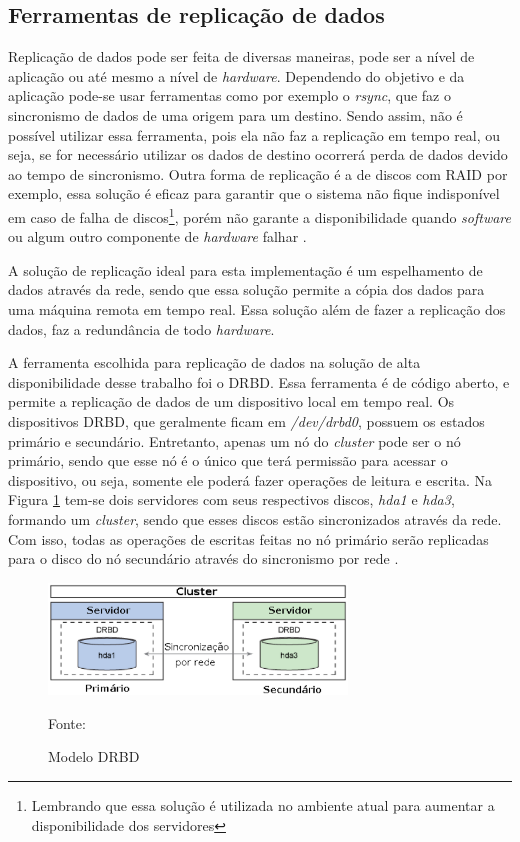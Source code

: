 \subsection{Ferramentas de replicação de dados}
\label{section:toolrepl}

Replicação de dados pode ser feita de diversas maneiras, pode ser a nível de aplicação ou até mesmo a nível de \textit{hardware}.
Dependendo do objetivo e da aplicação pode-se usar ferramentas como por exemplo o \textit{rsync}, que faz o sincronismo de dados de uma origem
para um destino. Sendo assim, não é possível utilizar essa ferramenta, pois ela não faz a replicação em tempo real, ou seja, se for necessário
utilizar os dados de destino ocorrerá perda de dados devido ao tempo de sincronismo. Outra forma de replicação é a de discos com \ac{RAID} 
por exemplo, essa solução é eficaz para garantir que o sistema não fique indisponível em caso de falha de discos\footnote{Lembrando que essa 
solução é utilizada no ambiente atual para aumentar a disponibilidade dos servidores}, porém não garante a disponibilidade quando \textit{software}
ou algum outro componente de \textit{hardware} falhar \cite{zaminhani2008}.

A solução de replicação ideal para esta implementação é um espelhamento de dados através da rede, sendo que essa solução permite a cópia dos 
dados para uma máquina remota em tempo real. Essa solução além de fazer a replicação dos dados, faz a redundância de todo \textit{hardware}.

A ferramenta escolhida para replicação de dados na solução de alta disponibilidade desse trabalho foi o \ac{DRBD}. Essa ferramenta é de código
aberto, e permite a replicação de dados de um dispositivo local em tempo real. Os dispositivos \ac{DRBD}, que geralmente ficam em 
\textit{/dev/drbd0}, possuem os estados primário e secundário. Entretanto, apenas um nó do \textit{cluster} pode ser o nó primário, sendo que
esse nó é o único que terá permissão para acessar o dispositivo, ou seja, somente ele poderá fazer operações de leitura e escrita.
Na Figura \ref{fig:drbd_basic} tem-se dois servidores com seus respectivos discos, \textit{hda1} e \textit{hda3}, formando um \textit{cluster}, 
sendo que esses discos estão sincronizados através da rede. Com isso, todas as operações de escritas feitas no nó primário serão replicadas para 
o disco do nó secundário através do sincronismo por rede \cite{zaminhani2008}.

\begin{figure}[h!]
 \centering
 \includegraphics[width=300px]{img/drbd_basic.eps}
 \caption{Modelo DRBD}
 Fonte: \citet{jones2010}
 \label{fig:drbd_basic}
\end{figure}

